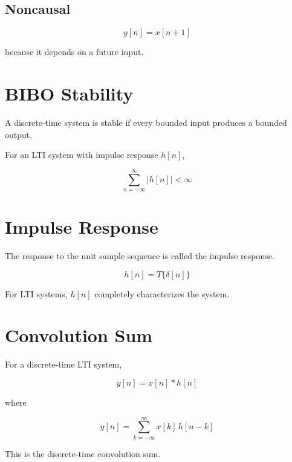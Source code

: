 
\subsection{Noncausal}

\[
y[n]=x[n+1]
\]

because it depends on a future input.


\section{BIBO Stability}

A discrete-time system is stable if every bounded input produces a bounded output.

For an LTI system with impulse response \(h[n]\),

\[
\boxed{
\sum_{n=-\infty}^{\infty}|h[n]|<\infty
}
\]


\section{Impulse Response}

The response to the unit sample sequence is called the impulse response.

\[
\boxed{
h[n]=T\{\delta[n]\}
}
\]

For LTI systems, \(h[n]\) completely characterizes the system.


\section{Convolution Sum}

For a discrete-time LTI system,

\[
\boxed{
y[n]=x[n]*h[n]
}
\]

where

\[
\boxed{
y[n]=
\sum_{k=-\infty}^{\infty}
x[k]\,h[n-k]
}
\]

This is the discrete-time convolution sum.


